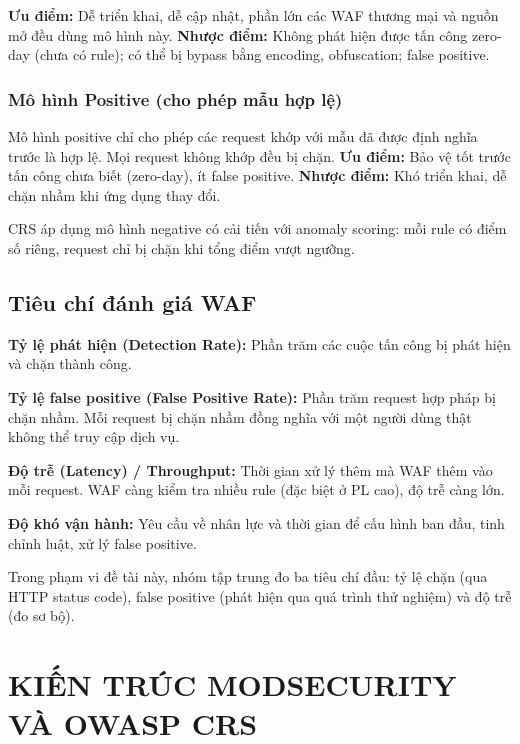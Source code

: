 \documentclass[12pt,a4paper,twoside]{report}
\begin{document}
\textbf{Ưu điểm:} Dễ triển khai, dễ cập nhật, phần lớn các WAF thương mại và nguồn mở đều dùng mô hình này. \textbf{Nhược điểm:} Không phát hiện được tấn công zero-day (chưa có rule); có thể bị bypass bằng encoding, obfuscation; false positive.

\subsection{Mô hình Positive (cho phép mẫu hợp lệ)}

Mô hình positive chỉ cho phép các request khớp với mẫu đã được định nghĩa trước là hợp lệ. Mọi request không khớp đều bị chặn. \textbf{Ưu điểm:} Bảo vệ tốt trước tấn công chưa biết (zero-day), ít false positive. \textbf{Nhược điểm:} Khó triển khai, dễ chặn nhầm khi ứng dụng thay đổi.

CRS áp dụng mô hình negative có cải tiến với anomaly scoring: mỗi rule có điểm số riêng, request chỉ bị chặn khi tổng điểm vượt ngưỡng.

\section{Tiêu chí đánh giá WAF}

\textbf{Tỷ lệ phát hiện (Detection Rate):} Phần trăm các cuộc tấn công bị phát hiện và chặn thành công.

\textbf{Tỷ lệ false positive (False Positive Rate):} Phần trăm request hợp pháp bị chặn nhầm. Mỗi request bị chặn nhầm đồng nghĩa với một người dùng thật không thể truy cập dịch vụ.

\textbf{Độ trễ (Latency) / Throughput:} Thời gian xử lý thêm mà WAF thêm vào mỗi request. WAF càng kiểm tra nhiều rule (đặc biệt ở PL cao), độ trễ càng lớn.

\textbf{Độ khó vận hành:} Yêu cầu về nhân lực và thời gian để cấu hình ban đầu, tinh chỉnh luật, xử lý false positive.

Trong phạm vi đề tài này, nhóm tập trung đo ba tiêu chí đầu: tỷ lệ chặn (qua HTTP status code), false positive (phát hiện qua quá trình thử nghiệm) và độ trễ (đo sơ bộ).

\chapter{KIẾN TRÚC MODSECURITY VÀ OWASP CRS}
\end{document}
